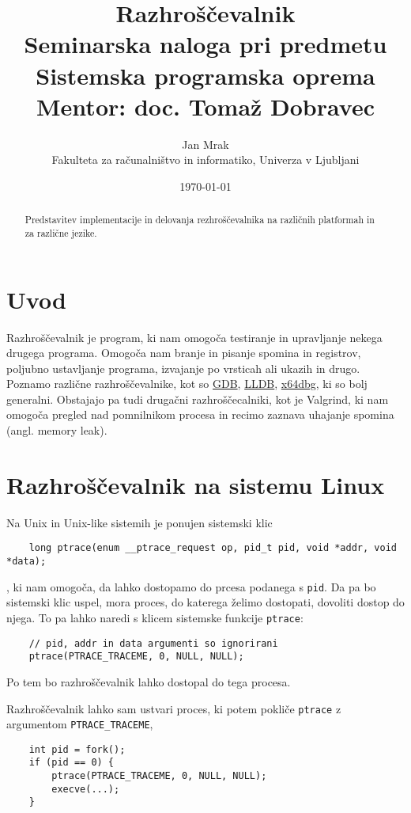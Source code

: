 \documentclass[a4paper,notitlepage]{article}
\author{Jan Mrak \\
    \small Fakulteta za računalništvo in informatiko, Univerza v Ljubljani}
\title{Razhroščevalnik\\
    \small Seminarska naloga pri predmetu Sistemska programska oprema
    \\
    \small Mentor: doc. Tomaž Dobravec}
\date{\today}
\newcommand{\code}[1]{\texttt{#1}}
\begin{document}
\maketitle
\thispagestyle{empty}

\begin{abstract}
	Predstavitev implementacije in delovanja rezhroščevalnika na različnih platformah in za različne jezike.
\end{abstract}

\section{Uvod}

Razhroščevalnik je program, ki nam omogoča testiranje in upravljanje nekega drugega programa. Omogoča nam branje in pisanje spomina in registrov, poljubno ustavljanje programa, izvajanje po vrsticah ali ukazih in drugo.
Poznamo različne razhroščevalnike, kot so \href{https://www.sourceware.org/gdb/}{GDB}, \href{https://lldb.llvm.org/}{LLDB}, \href{https://x64dbg.com/}{x64dbg}, ki so bolj generalni. Obstajajo pa tudi drugačni razhroščecalniki, kot je Valgrind, ki nam omogoča pregled nad pomnilnikom procesa in recimo zaznava uhajanje spomina (angl. memory leak).

\section{Razhroščevalnik na sistemu Linux}

Na Unix in Unix-like sistemih je ponujen sistemski klic
\begin{verbatim}
    long ptrace(enum __ptrace_request op, pid_t pid, void *addr, void *data);    
\end{verbatim}
, ki nam omogoča, da lahko dostopamo do prcesa podanega s \code{pid}. Da pa bo sistemski klic uspel, mora proces, do katerega želimo dostopati, dovoliti dostop do njega.
To pa lahko naredi s klicem sistemske funkcije \code{ptrace}:
\begin{verbatim}
    // pid, addr in data argumenti so ignorirani
    ptrace(PTRACE_TRACEME, 0, NULL, NULL);
\end{verbatim}

Po tem bo razhroščevalnik lahko dostopal do tega procesa.

Razhroščevalnik lahko sam ustvari proces, ki potem pokliče \code{ptrace} z argumentom \code{PTRACE_TRACEME},

\begin{verbatim}
    int pid = fork();
    if (pid == 0) {
        ptrace(PTRACE_TRACEME, 0, NULL, NULL);
        execve(...);
    }
\end{verbatim}
\end{document}

